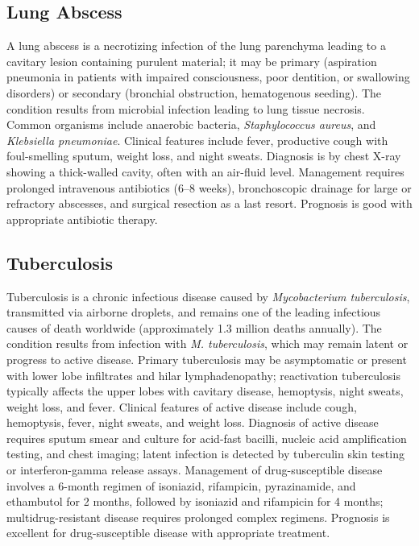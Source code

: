 \subsection{Lung Abscess}
\label{sec:Lung Abscess}
A lung abscess is a necrotizing infection of the lung parenchyma leading to a cavitary lesion containing purulent material; it may be primary (aspiration pneumonia in patients with impaired consciousness, poor dentition, or swallowing disorders) or secondary (bronchial obstruction, hematogenous seeding). The condition results from microbial infection leading to lung tissue necrosis. Common organisms include anaerobic bacteria, \textit{Staphylococcus aureus}, and \textit{Klebsiella pneumoniae}. Clinical features include fever, productive cough with foul-smelling sputum, weight loss, and night sweats. Diagnosis is by chest X-ray showing a thick-walled cavity, often with an air-fluid level. Management requires prolonged intravenous antibiotics (6--8 weeks), bronchoscopic drainage for large or refractory abscesses, and surgical resection as a last resort. Prognosis is good with appropriate antibiotic therapy.

\subsection{Tuberculosis}
\label{sec:Tuberculosis}
Tuberculosis is a chronic infectious disease caused by \textit{Mycobacterium tuberculosis}, transmitted via airborne droplets, and remains one of the leading infectious causes of death worldwide (approximately 1.3 million deaths annually). The condition results from infection with \textit{M. tuberculosis}, which may remain latent or progress to active disease. Primary tuberculosis may be asymptomatic or present with lower lobe infiltrates and hilar lymphadenopathy; reactivation tuberculosis typically affects the upper lobes with cavitary disease, hemoptysis, night sweats, weight loss, and fever. Clinical features of active disease include cough, hemoptysis, fever, night sweats, and weight loss. Diagnosis of active disease requires sputum smear and culture for acid-fast bacilli, nucleic acid amplification testing, and chest imaging; latent infection is detected by tuberculin skin testing or interferon-gamma release assays. Management of drug-susceptible disease involves a 6-month regimen of isoniazid, rifampicin, pyrazinamide, and ethambutol for 2 months, followed by isoniazid and rifampicin for 4 months; multidrug-resistant disease requires prolonged complex regimens. Prognosis is excellent for drug-susceptible disease with appropriate treatment.

